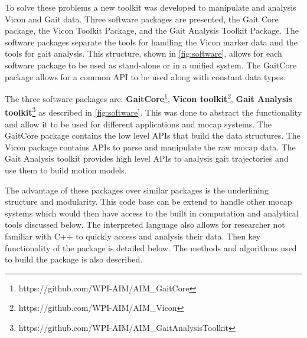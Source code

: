 To solve these problems a new toolkit was developed to manipulate and analysis Vicon and Gait data. Three software packages are presented, the Gait Core package, the Vicon Toolkit Package, and the Gait Analysis Toolkit Package. The software packages separate the tools for handling the Vicon marker data and the tools for gait analysis. This structure, shown in \autoref{fig:software}, allows for each software package to be used as stand-alone or in a unified system. The GaitCore package allows for a common API to be used along with constant data types.   

The three software packages are: 
 \textbf{GaitCore}\footnote{https://github.com/WPI-AIM/AIM\_GaitCore}, \textbf{Vicon toolkit}\footnote{https://github.com/WPI-AIM/AIM\_Vicon},  \textbf{Gait Analysis toolkit}\footnote{https://github.com/WPI-AIM/AIM\_GaitAnalysisToolkit} as described in \autoref{fig:software}. This was done to abstract the functionality and allow it to be used for different applications and mocap systems. The GaitCore package contains the low level APIs that build the data structures. The Vicon package contains APIs to parse and manipulate the raw mocap data. The Gait Analysis toolkit provides high level APIs to analysis gait trajectories and use them to build motion models. 

The advantage of these packages over similar packages is the underlining structure and modularity. This code base can be extend to handle other mocap systems which would then have access to the built in computation and analytical tools discussed below. The interpreted language also allows for researcher not familiar with C++ to quickly access and analysis their data. Then key functionality of the package is detailed below. The methods and algorithms used to build the package is also described. 




